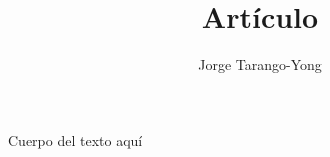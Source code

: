 \documentclass[12pt]{article}
\title{Art\'iculo}
\author{Jorge Tarango-Yong}
\begin{document}
\maketitle

Cuerpo del texto aqu\'i
\end{document}
